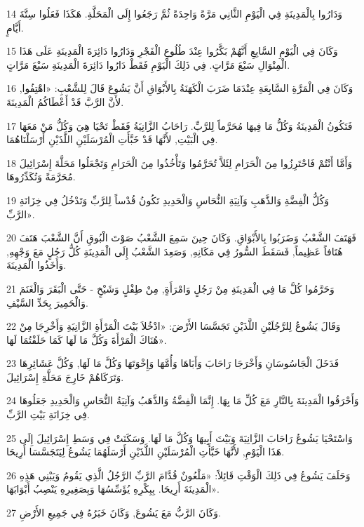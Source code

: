 \par 14 وَدَارُوا بِالْمَدِينَةِ فِي الْيَوْمِ الثَّانِي مَرَّةً وَاحِدَةً ثُمَّ رَجَعُوا إِلَى الْمَحَلَّةِ. هَكَذَا فَعَلُوا سِتَّةَ أَيَّامٍ.
\par 15 وَكَانَ فِي الْيَوْمِ السَّابِعِ أَنَّهُمْ بَكَّرُوا عِنْدَ طُلُوعِ الْفَجْرِ وَدَارُوا دَائِرَةَ الْمَدِينَةِ عَلَى هَذَا الْمِنْوَالِ سَبْعَ مَرَّاتٍ. فِي ذَلِكَ الْيَوْمِ فَقَطْ دَارُوا دَائِرَةَ الْمَدِينَةِ سَبْعَ مَرَّاتٍ.
\par 16 وَكَانَ فِي الْمَرَّةِ السَّابِعَةِ عِنْدَمَا ضَرَبَ الْكَهَنَةُ بِالأَبْوَاقِ أَنَّ يَشُوعَ قَالَ لِلشَّعْبِ: «اهْتِفُوا, لأَنَّ الرَّبَّ قَدْ أَعْطَاكُمُ الْمَدِينَةَ.
\par 17 فَتَكُونُ الْمَدِينَةُ وَكُلُّ مَا فِيهَا مُحَرَّماً لِلرَّبِّ. رَاحَابُ الزَّانِيَةُ فَقَطْ تَحْيَا هِيَ وَكُلُّ مَنْ مَعَهَا فِي الْبَيْتِ, لأَنَّهَا قَدْ خَبَّأَتِ الْمُرْسَلَيْنِ اللَّذَيْنِ أَرْسَلْنَاهُمَا.
\par 18 وَأَمَّا أَنْتُمْ فَاحْتَرِزُوا مِنَ الْحَرَامِ لِئَلاَّ تُحَرَّمُوا وَتَأْخُذُوا مِنَ الْحَرَامِ وَتَجْعَلُوا مَحَلَّةَ إِسْرَائِيلَ مُحَرَّمَةً وَتُكَدِّرُوهَا.
\par 19 وَكُلُّ الْفِضَّةِ وَالذَّهَبِ وَآنِيَةِ النُّحَاسِ وَالْحَدِيدِ تَكُونُ قُدْساً لِلرَّبِّ وَتَدْخُلُ فِي خِزَانَةِ الرَّبِّ».
\par 20 فَهَتَفَ الشَّعْبُ وَضَرَبُوا بِالأَبْوَاقِ. وَكَانَ حِينَ سَمِعَ الشَّعْبُ صَوْتَ الْبُوقِ أَنَّ الشَّعْبَ هَتَفَ هُتَافاً عَظِيماً, فَسَقَطَ السُّورُ فِي مَكَانِهِ, وَصَعِدَ الشَّعْبُ إِلَى الْمَدِينَةِ كُلُّ رَجُلٍ مَعَ وَجْهِهِ, وَأَخَذُوا الْمَدِينَةَ.
\par 21 وَحَرَّمُوا كُلَّ مَا فِي الْمَدِينَةِ مِنْ رَجُلٍ وَامْرَأَةٍ, مِنْ طِفْلٍ وَشَيْخٍ - حَتَّى الْبَقَرَ وَالْغَنَمَ وَالْحَمِيرَ بِحَدِّ السَّيْفِ.
\par 22 وَقَالَ يَشُوعُ لِلرَّجُلَيْنِ اللَّذَيْنِ تَجَسَّسَا الأَرْضَ: «ادْخُلاَ بَيْتَ الْمَرْأَةِ الزَّانِيَةِ وَأَخْرِجَا مِنْ هُنَاكَ الْمَرْأَةَ وَكُلَّ مَا لَهَا كَمَا حَلَفْتُمَا لَهَا».
\par 23 فَدَخَلَ الْجَاسُوسَانِ وَأَخْرَجَا رَاحَابَ وَأَبَاهَا وَأُمَّهَا وَإِخْوَتَهَا وَكُلَّ مَا لَهَا, وَكُلَّ عَشَائِرِهَا وَتَرَكَاهُمْ خَارِجَ مَحَلَّةِ إِسْرَائِيلَ.
\par 24 وَأَحْرَقُوا الْمَدِينَةَ بِالنَّارِ مَعَ كُلِّ مَا بِهَا. إِنَّمَا الْفِضَّةُ وَالذَّهَبُ وَآنِيَةُ النُّحَاسِ وَالْحَدِيدِ جَعَلُوهَا فِي خِزَانَةِ بَيْتِ الرَّبِّ.
\par 25 وَاسْتَحْيَا يَشُوعُ رَاحَابَ الزَّانِيَةَ وَبَيْتَ أَبِيهَا وَكُلَّ مَا لَهَا. وَسَكَنَتْ فِي وَسَطِ إِسْرَائِيلَ إِلَى هَذَا الْيَوْمِ, لأَنَّهَا خَبَّأَتِ الْمُرْسَلَيْنِ اللَّذَيْنِ أَرْسَلَهُمَا يَشُوعُ لِيَتَجَسَّسَا أَرِيحَا.
\par 26 وَحَلَفَ يَشُوعُ فِي ذَلِكَ الْوَقْتِ قَائِلاً: «مَلْعُونٌ قُدَّامَ الرَّبِّ الرَّجُلُ الَّذِي يَقُومُ وَيَبْنِي هَذِهِ الْمَدِينَةَ أَرِيحَا. بِبِكْرِهِ يُؤَسِّسُهَا وَبِصَغِيرِهِ يَنْصِبُ أَبْوَابَهَا».
\par 27 وَكَانَ الرَّبُّ مَعَ يَشُوعَ, وَكَانَ خَبَرُهُ فِي جَمِيعِ الأَرْضِ.

